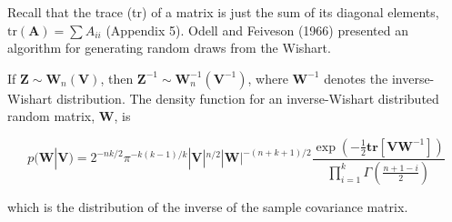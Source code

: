 \documentclass{article}
\begin{document}
Recall that the trace (tr) of a matrix is just the sum of its diagonal elements,  $ \mathrm{tr}(\mathbf{A}) = \sum A_{ii} $ (Appendix 5). Odell and Feiveson (1966) presented an algorithm for generating random draws from the Wishart.

If  $  \mathbf{Z} \sim \mathbf{W}_n(\mathbf{V})  $, then  $  \mathbf{Z}^{-1} \sim \mathbf{W}_n^{-1}(\mathbf{V}^{-1})  $, where  $  \mathbf{W}^{-1}  $ denotes the inverse-Wishart distribution. The density function for an inverse-Wishart distributed random matrix,  $  \mathbf{W}  $, is

\begin{equation}
p(\mathbf{W}|\mathbf{V})=2^{-n k/2}\pi^{-k(k-1)/k}|\mathbf{V}|^{n/2}|\mathbf{W}|^{-(n+k+1)/2}\frac{\exp\left(-\frac{1}{2}\mathbf{t}\mathbf{r}\left[\mathbf{V}\mathbf{W}^{-1}\right]\right)}{\prod_{i=1}^{k}\Gamma\left(\frac{n+1-i}{2}\right)}
\end{equation}

which is the distribution of the inverse of the sample covariance matrix.
\end{document}

